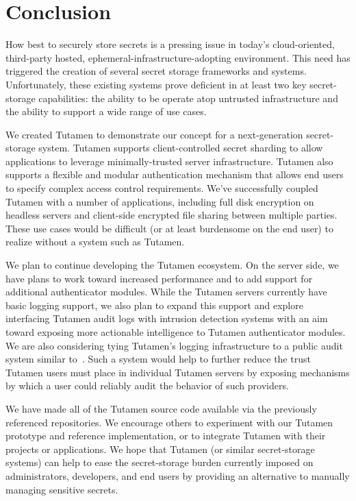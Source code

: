 \section{Conclusion}
\label{sec:conclusion}

How best to securely store secrets is a pressing issue in today's
cloud-oriented, third-party hosted, ephemeral-infrastructure-adopting
environment. This need has triggered the creation of several secret
storage frameworks and systems. Unfortunately, these existing systems
prove deficient in at least two key secret-storage capabilities: the
ability to be operate atop untrusted infrastructure and the ability to
support a wide range of use cases.

We created Tutamen to demonstrate our concept for a next-generation
secret-storage system. Tutamen supports client-controlled secret
sharding to allow applications to leverage minimally-trusted server
infrastructure. Tutamen also supports a flexible and modular
authentication mechanism that allows end users to specify complex
access control requirements. We've successfully coupled Tutamen with a
number of applications, including full disk encryption on headless
servers and client-side encrypted file sharing between multiple
parties. These use cases would be difficult (or at least burdensome on
the end user) to realize without a system such as Tutamen.

We plan to continue developing the Tutamen ecosystem. On the server
side, we have plans to work toward increased performance and to add
support for additional authenticator modules. While the Tutamen
servers currently have basic logging support, we also plan to expand
this support and explore interfacing Tutamen audit logs with intrusion
detection systems with an aim toward exposing more actionable
intelligence to Tutamen authenticator modules. We are also considering
tying Tutamen's logging infrastructure to a public audit system
similar to~\cite{laurie2013}. Such a system would help to further
reduce the trust Tutamen users must place in individual Tutamen
servers by exposing mechanisms by which a user could reliably audit
the behavior of such providers.

We have made all of the Tutamen source code available via the
previously referenced repositories. We encourage others to experiment
with our Tutamen prototype and reference implementation, or to
integrate Tutamen with their projects or applications. We hope that
Tutamen (or similar secret-storage systems) can help to ease the
secret-storage burden currently imposed on administrators, developers,
and end users by providing an alternative to manually managing
sensitive secrets.

